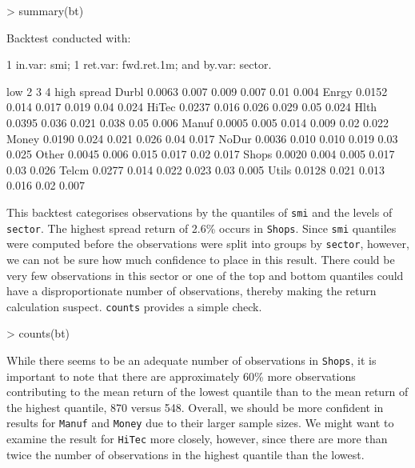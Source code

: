 \documentclass[a4paper]{report}
\begin{document}
\begin{article}
\begin{Schunk}
\begin{Sinput}
> summary(bt)
\end{Sinput}
\begin{Soutput}
Backtest conducted with:

1 in.var: smi;
1 ret.var: fwd.ret.1m;
and by.var: sector.

         low     2     3     4 high spread
Durbl 0.0063 0.007 0.009 0.007 0.01  0.004
Enrgy 0.0152 0.014 0.017 0.019 0.04  0.024
HiTec 0.0237 0.016 0.026 0.029 0.05  0.024
Hlth  0.0395 0.036 0.021 0.038 0.05  0.006
Manuf 0.0005 0.005 0.014 0.009 0.02  0.022
Money 0.0190 0.024 0.021 0.026 0.04  0.017
NoDur 0.0036 0.010 0.010 0.019 0.03  0.025
Other 0.0045 0.006 0.015 0.017 0.02  0.017
Shops 0.0020 0.004 0.005 0.017 0.03  0.026
Telcm 0.0277 0.014 0.022 0.023 0.03  0.005
Utils 0.0128 0.021 0.013 0.016 0.02  0.007
\end{Soutput}
\end{Schunk}


This backtest categorises observations by the quantiles of
\texttt{smi} and the levels of \texttt{sector}.  The highest spread
return of 2.6\% occurs in \texttt{Shops}.  Since \texttt{smi}
quantiles were computed before the observations were split into groups
by \texttt{sector}, however, we can not be sure how much confidence to
place in this result.  There could be very few observations in this
sector or one of the top and bottom quantiles could have a
disproportionate number of observations, thereby making the return
calculation suspect. \texttt{counts} provides a simple check.

\begin{Schunk}
\begin{Sinput}
> counts(bt)
\end{Sinput}
\end{Schunk}

While there seems to be an adequate number of observations in
\texttt{Shops}, it is important to note that there are approximately
60\% more observations contributing to the mean return of the lowest
quantile than to the mean return of the highest quantile, 870 versus
548.  Overall, we should be more confident in results for
\texttt{Manuf} and \texttt{Money} due to their larger sample sizes.
We might want to examine the result for \texttt{HiTec} more closely,
however, since there are more than twice the number of observations in
the highest quantile than the lowest.


\end{article}
\end{document}

